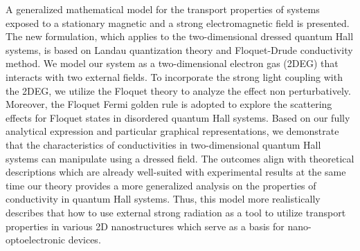 A generalized mathematical model for the transport properties of systems exposed to a stationary magnetic and a strong electromagnetic field is presented. The new formulation, which applies to the two-dimensional dressed quantum Hall systems, is based on Landau quantization theory and Floquet-Drude conductivity method. We model our system as a two-dimensional electron gas (2DEG) that interacts with two external fields. To incorporate the strong light coupling with the 2DEG, we utilize the Floquet theory to analyze the effect non perturbatively. Moreover, the Floquet Fermi golden rule is adopted to explore the scattering effects for Floquet states in disordered quantum Hall systems. Based on our fully analytical expression and particular graphical representations, we demonstrate
that the characteristics of conductivities in two-dimensional quantum Hall systems can manipulate using a dressed field. The outcomes align with theoretical descriptions which are already well-suited with experimental results at the same time our theory provides a more generalized analysis on the properties of conductivity in quantum Hall systems. Thus, this model more realistically describes that how to use external strong radiation as a tool to utilize transport properties in various 2D nanostructures which serve as a basis for nano-optoelectronic devices.

